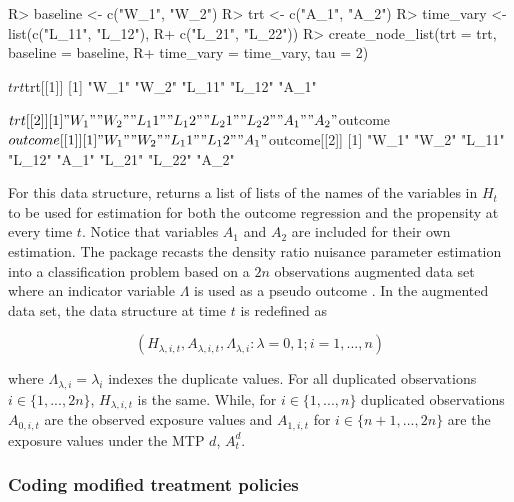 \documentclass[]{jss}
\begin{document}
\begin{CodeChunk}

\begin{CodeInput}
R> baseline <- c("W_1", "W_2")
R> trt <- c("A_1", "A_2")
R> time_vary <- list(c("L_11", "L_12"), 
R+                   c("L_21", "L_22"))
R> create_node_list(trt = trt, baseline = baseline, 
R+                  time_vary = time_vary, tau = 2)
\end{CodeInput}

\begin{CodeOutput}
$trt
$trt[[1]]
[1] "W_1"  "W_2"  "L_11" "L_12" "A_1" 

$trt[[2]]
[1] "W_1"  "W_2"  "L_11" "L_12" "L_21" "L_22" "A_1"  "A_2" 


$outcome
$outcome[[1]]
[1] "W_1"  "W_2"  "L_11" "L_12" "A_1" 

$outcome[[2]]
[1] "W_1"  "W_2"  "L_11" "L_12" "A_1"  "L_21" "L_22" "A_2" 
\end{CodeOutput}
\end{CodeChunk}

For this data structure,  returns a list of lists
of the names of the variables in \(H_t\) to be used for estimation for
both the outcome regression and the propensity at every time \(t\).
Notice that variables \(A_1\) and \(A_2\) are included for their own
estimation. The  package recasts the density ratio nuisance
parameter estimation into a classification problem based on a \(2n\)
observations augmented data set where an indicator variable \(\Lambda\)
is used as a pseudo outcome
\citep{chengSemiparametricDensityEstimation2004, qinInferencesCaseControlSemiparametric1998}.
In the augmented data set, the data structure at time \(t\) is
redefined as

\begin{equation}
(H_{\lambda, i, t}, A_{\lambda, i, t}, \Lambda_{\lambda, i} : \lambda = 0, 1; i = 1, ..., n)
\end{equation}

where \(\Lambda_{\lambda, i} = \lambda_i\) indexes the duplicate values.
For all duplicated observations \(i \in \{1, ..., 2n\}\),
\(H_{\lambda, i, t}\) is the same. While, for \(i \in \{1, ..., n\}\)
duplicated observations \(A_{0, i, t}\) are the observed exposure values
and \(A_{1, i, t}\) for \(i \in \{n+1, ..., 2n\}\) are the exposure
values under the MTP \(d\), \(A^{d}_t\).

\hypertarget{coding-modified-treatment-policies}{%
\subsubsection{Coding modified treatment
policies}\label{coding-modified-treatment-policies}}
\end{document}
